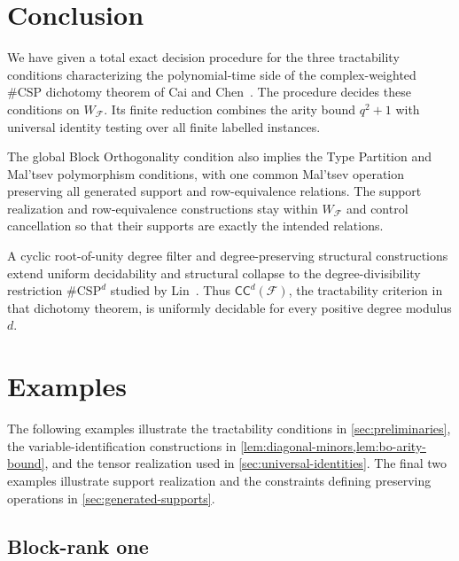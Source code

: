 \documentclass[11pt,letterpaper,onecolumn]{article}
\theoremstyle{plain}
\theoremstyle{definition}
\theoremstyle{remark}
\newcommand{\cF}{\mathcal F}
\newcommand{\CC}{\mathsf{CC}}
\begin{document}
\section{Conclusion}
\label{sec:conclusion}

We have given a total exact decision procedure for the three tractability
conditions characterizing the polynomial-time side of the complex-weighted
$\#\mathrm{CSP}$ dichotomy theorem of Cai and
Chen~\cite[Theorem~1 and Section~3.1]{CaiChen2017}.  The procedure decides
these conditions on $W_{\cF}$.
Its finite reduction combines the arity bound $q^2+1$ with universal
identity testing over all finite labelled instances.

The global Block Orthogonality condition also implies the Type Partition
and Mal'tsev polymorphism conditions, with one common Mal'tsev operation
preserving all generated support and row-equivalence relations.
The support realization and row-equivalence constructions stay within
$W_{\cF}$ and control cancellation so that their supports are exactly the
intended relations.

A cyclic root-of-unity degree filter and degree-preserving structural
constructions extend uniform decidability and structural collapse to the
degree-divisibility restriction $\#\mathrm{CSP}^{d}$ studied by
Lin~\cite[Definition~2 and Theorem~3]{Lin2021}.  Thus $\CC^d(\cF)$, the
tractability criterion in that dichotomy theorem, is uniformly decidable
for every positive degree modulus $d$.

\clearpage
\appendix
\renewcommand{\thesection}{F.\Alph{section}}
\renewcommand{\theHsection}{fullappendix.\Alph{section}}
\section{Examples}
\label{app:tractability-examples}

The following examples illustrate the tractability conditions in
\cref{sec:preliminaries}, the variable-identification constructions in
\cref{lem:diagonal-minors,lem:bo-arity-bound}, and the tensor
realization used in \cref{sec:universal-identities}.  The final two
examples illustrate support realization and the constraints defining
preserving operations in \cref{sec:generated-supports}.

\subsection{Block-rank one}
\label{app:block-rank-one-example}
\end{document}
